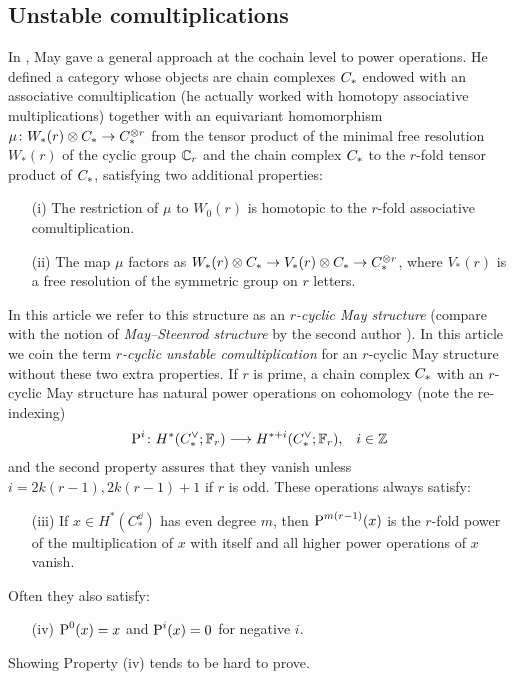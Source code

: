 \subsection{Unstable comultiplications} In \cite{may1970general}, May gave a general approach at the cochain level to power operations. He defined a category whose objects are chain complexes $C_{*}$ endowed with an associative comultiplication (he actually worked with homotopy associative multiplications) together with an equivariant homomorphism $\mu\colon W_*(r)\otimes C_{*}\to C_{*}^{\otimes r}$ from the tensor product of the minimal free resolution $W_*(r)$ of the cyclic group $\mathbb{C}_r$ and the chain complex $C_{*}$ to the $r$-fold tensor product of $C_{*}$, satisfying two additional properties:
\begin{itemize}
	\item[(i)] The restriction of $\mu$ to $W_0(r)$ is homotopic to the $r$-fold associative comultiplication.
	\item[(ii)] The map $\mu$ factors as $W_*(r)\otimes C_{*} \to V_*(r)\otimes C_{*}\to C_{*}^{\otimes r}$, where $V_*(r)$ is a free resolution of the symmetric group on $r$ letters.
\end{itemize}
In this article we refer to this structure as an \emph{$r$-cyclic May structure} (compare with the notion of \emph{May--Steenrod structure} by the second author \cite{medina2021may_st}). In this article we coin the term \emph{$r$-cyclic unstable comultiplication} for an $r$-cyclic May structure without these two extra properties. If $r$ is prime, a chain complex $C_{*}$ with an $r$-cyclic May structure has natural power operations on cohomology (note the re-indexing)
\begin{align*}
	\operatorname{P}^i\colon H^*(C^\vee_{*};\mathbb{F}_r)&\longrightarrow H^{*+i}(C^\vee_{*};\mathbb{F}_r), & i\in \mathbb{Z}
\end{align*}
and the second property assures that they vanish unless $i = 2k(r-1), 2k(r-1)+1$ if $r$ is odd.
These operations always satisfy:
\begin{itemize}
	\item[(iii)] If $x\in H^*(C_*^\dd)$ has even degree $m$, then $\operatorname{P}^{m(r-1)}(x)$ is the $r$-fold power of the multiplication of $x$ with itself and all higher power operations of $x$ vanish.
\end{itemize}
Often they also satisfy:
\begin{enumerate}
	\item[(iv)] $\operatorname{P}^0(x) = x$ and $\operatorname{P}^i(x) = 0$ for negative $i$.
\end{enumerate}
Showing Property (iv) tends to be hard to prove.

